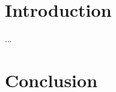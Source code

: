 \documentclass[colorlink,llncs]{engpaper}
\begin{document}
\conference{}{}{}

\title{}

\author{
\authorblock{}{}{}
}

\notacmtransonly{\maketitle}
\begin{abstract}
...
\end{abstract}
            


\acmtransonly{\maketitle}
\section{Introduction}
...

\section{Conclusion}






\end{document}
